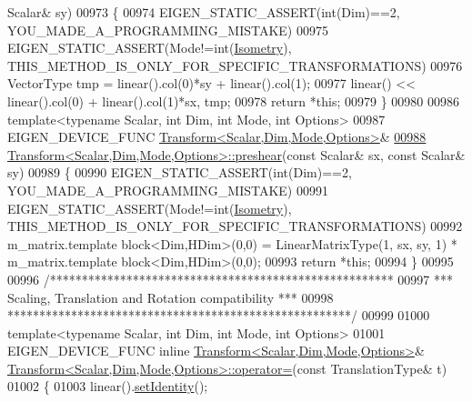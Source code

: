 \begin{DoxyCode}
      Scalar& sy)
00973 \{
00974   EIGEN\_STATIC\_ASSERT(\textcolor{keywordtype}{int}(Dim)==2, YOU\_MADE\_A\_PROGRAMMING\_MISTAKE)
00975   EIGEN\_STATIC\_ASSERT(Mode!=\textcolor{keywordtype}{int}(\hyperlink{group__enums_ggaee59a86102f150923b0cac6d4ff05107a080cd5366173608f701cd945c2335568}{Isometry}), THIS\_METHOD\_IS\_ONLY\_FOR\_SPECIFIC\_TRANSFORMATIONS)
00976   VectorType tmp = linear().col(0)*sy + linear().col(1);
00977   linear() << linear().col(0) + linear().col(1)*sx, tmp;
00978   \textcolor{keywordflow}{return} *\textcolor{keyword}{this};
00979 \}
00980 
00986 \textcolor{keyword}{template}<\textcolor{keyword}{typename} Scalar, \textcolor{keywordtype}{int} Dim, \textcolor{keywordtype}{int} Mode, \textcolor{keywordtype}{int} Options>
00987 EIGEN\_DEVICE\_FUNC \hyperlink{group___geometry___module_class_eigen_1_1_transform}{Transform<Scalar,Dim,Mode,Options>}&
\hyperlink{group___geometry___module_a2540957bb590f16260689bcf32d28a7a}{00988} \hyperlink{group___geometry___module_a2540957bb590f16260689bcf32d28a7a}{Transform<Scalar,Dim,Mode,Options>::preshear}(\textcolor{keyword}{const} Scalar& sx, \textcolor{keyword}{
      const} Scalar& sy)
00989 \{
00990   EIGEN\_STATIC\_ASSERT(\textcolor{keywordtype}{int}(Dim)==2, YOU\_MADE\_A\_PROGRAMMING\_MISTAKE)
00991   EIGEN\_STATIC\_ASSERT(Mode!=\textcolor{keywordtype}{int}(\hyperlink{group__enums_ggaee59a86102f150923b0cac6d4ff05107a080cd5366173608f701cd945c2335568}{Isometry}), THIS\_METHOD\_IS\_ONLY\_FOR\_SPECIFIC\_TRANSFORMATIONS)
00992   m\_matrix.template block<Dim,HDim>(0,0) = LinearMatrixType(1, sx, sy, 1) * m\_matrix.template 
      block<Dim,HDim>(0,0);
00993   \textcolor{keywordflow}{return} *\textcolor{keyword}{this};
00994 \}
00995 
00996 \textcolor{comment}{/******************************************************}
00997 \textcolor{comment}{*** Scaling, Translation and Rotation compatibility ***}
00998 \textcolor{comment}{******************************************************/}
00999 
01000 \textcolor{keyword}{template}<\textcolor{keyword}{typename} Scalar, \textcolor{keywordtype}{int} Dim, \textcolor{keywordtype}{int} Mode, \textcolor{keywordtype}{int} Options>
01001 EIGEN\_DEVICE\_FUNC \textcolor{keyword}{inline} \hyperlink{group___geometry___module_class_eigen_1_1_transform}{Transform<Scalar,Dim,Mode,Options>}& 
      \hyperlink{group___geometry___module_class_eigen_1_1_transform}{Transform<Scalar,Dim,Mode,Options>::operator=}(\textcolor{keyword}{const} 
      TranslationType& t)
01002 \{
01003   linear().\hyperlink{group___geometry___module_a4f0c6b74994904b56b621cf3d9ac4a0f}{setIdentity}();

\end{DoxyCode}
